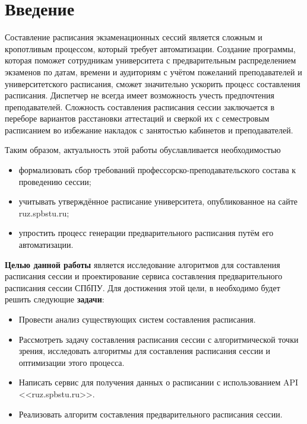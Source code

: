 \chapter*{Введение} %

Составление расписания экзаменационных сессий является сложным и кропотливым процессом, который требует автоматизации. Создание программы, которая поможет сотрудникам университета с предварительным распределением экзаменов по датам, времени и аудиториям с учётом пожеланий преподавателей и университетского расписания, сможет значительно ускорить процесс составления расписания. Диспетчер не всегда имеет возможность учесть предпочтения преподавателей.
Сложность составления расписания сессии заключается в переборе вариантов расстановки аттестаций и сверкой их с семестровым расписанием во избежание накладок с занятостью кабинетов и преподавателей. 

Таким образом, актуальность этой работы обуславливается необходимостью
\begin{itemize}
	\item формализовать сбор требований профессорско-преподавательского состава к проведению сессии;
	\item учитывать утверждённое расписание университета, опубликованное на сайте ruz.spbstu.ru;
	\item упростить процесс генерации предварительного расписания путём его автоматизации.
\end{itemize}

\textbf{Целью данной работы} является исследование алгоритмов для составления расписания сессии и проектирование сервиса составления предварительного расписания сессии СПбПУ.
Для достижения этой цели, в необходимо будет решить следующие \textbf{задачи}:

\begin{itemize}
	\item Провести анализ существующих систем составления расписания.
	\item Рассмотреть задачу составления расписания сессии с алгоритмической точки зрения, исследовать алгоритмы для составления расписания сессии и оптимизации этого процесса.
	\item Написать сервис для получения данных о расписании с использованием API <<ruz.spbstu.ru>>. %
	\item Реализовать алгоритм составления предварительного расписания сессии. 
\end{itemize}
